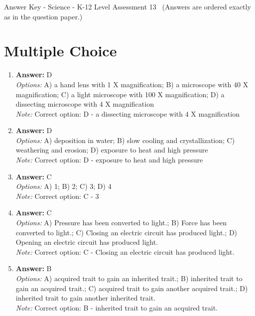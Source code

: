 \documentclass[12pt]{article}
\begin{document}
\begin{center}
Answer Key - Science - K-12 Level Assessment 13 \
\small (Answers are ordered exactly as in the question paper.)
\end{center}

\section*{Multiple Choice}
\begin{enumerate}[label=\arabic*.]
\item \textbf{Answer:} D
\\ \textit{Options:} A) a hand lens with 1 X magnification; B) a microscope with 40 X magnification; C) a light microscope with 100 X magnification; D) a dissecting microscope with 4 X magnification
\\ \textit{Note:} Correct option: D - a dissecting microscope with 4 X magnification
\item \textbf{Answer:} D
\\ \textit{Options:} A) deposition in water; B) slow cooling and crystallization; C) weathering and erosion; D) exposure to heat and high pressure
\\ \textit{Note:} Correct option: D - exposure to heat and high pressure
\item \textbf{Answer:} C
\\ \textit{Options:} A) 1; B) 2; C) 3; D) 4
\\ \textit{Note:} Correct option: C - 3
\item \textbf{Answer:} C
\\ \textit{Options:} A) Pressure has been converted to light.; B) Force has been converted to light.; C) Closing an electric circuit has produced light.; D) Opening an electric circuit has produced light.
\\ \textit{Note:} Correct option: C - Closing an electric circuit has produced light.
\item \textbf{Answer:} B
\\ \textit{Options:} A) acquired trait to gain an inherited trait.; B) inherited trait to gain an acquired trait.; C) acquired trait to gain another acquired trait.; D) inherited trait to gain another inherited trait.
\\ \textit{Note:} Correct option: B - inherited trait to gain an acquired trait.
\end{enumerate}
\end{document}
